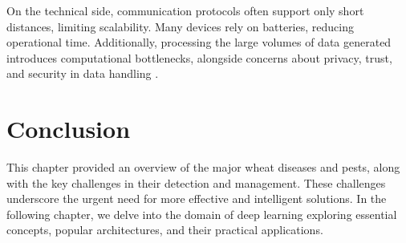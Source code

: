On the technical side, communication protocols often support only short distances, limiting scalability. Many devices rely on batteries, reducing operational time. Additionally, processing the large volumes of data generated introduces computational bottlenecks, alongside concerns about privacy, trust, and security in data handling \parencite{idoje2021survey}.



\section{Conclusion}

This chapter provided an overview of the major wheat diseases and pests, along with the key challenges in their detection and management. These challenges underscore the urgent need for more effective and intelligent solutions. In the following chapter, we delve into the domain of deep learning exploring essential concepts, popular architectures, and their practical applications.



